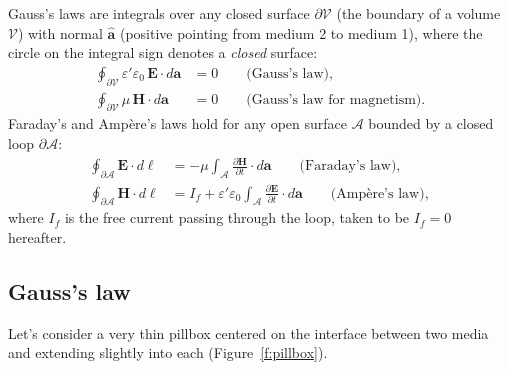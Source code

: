 \documentclass[11pt, oneside]{article}
\begin{document}
Gauss's laws are integrals over any closed surface $\partial\mathcal{V}$ (the boundary of a volume $\mathcal{V}$) with normal $\hat{\mathbf{a}}$ (positive pointing from medium 2 to medium 1), where the circle on the integral sign denotes a \emph{closed} surface:
\begin{align}
	\oint_{\partial\mathcal{V}} \varepsilon'\varepsilon_0\,\mathbf{E}\cdot d\mathbf{a} &= 0 \qquad \text{(Gauss's law)}, \\
	\oint_{\partial\mathcal{V}} \mu\,\mathbf{H}\cdot d\mathbf{a} &= 0 \qquad \text{(Gauss's law for magnetism)}.
\end{align}
Faraday's and Amp\`ere's laws hold for any open surface $\mathcal{A}$ bounded by a closed loop $\partial\mathcal{A}$:
\begin{align}
	\oint_{\partial\mathcal{A}} \mathbf{E}\cdot d\boldsymbol{\ell} &= -\mu\int_{\mathcal{A}} \frac{\partial\mathbf{H}}{\partial t}\cdot d\mathbf{a} \qquad \text{(Faraday's law)}, \\
	\oint_{\partial\mathcal{A}} \mathbf{H}\cdot d\boldsymbol{\ell} &= I_f + \varepsilon'\varepsilon_0\int_{\mathcal{A}} \frac{\partial\mathbf{E}}{\partial t}\cdot d\mathbf{a} \qquad \text{(Amp\`ere's law)},
\end{align}
where $I_f$ is the free current passing through the loop, taken to be $I_f = 0$ hereafter.

\subsection{Gauss's law}

Let's consider a very thin pillbox centered on the interface between two media and extending slightly into each (Figure~\ref{f:pillbox}).
\end{document}
